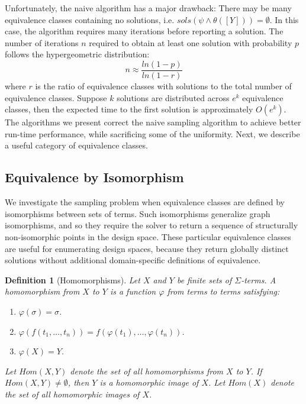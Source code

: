 \documentclass[conference]{IEEEtran}
\newtheorem{defn}{Definition}
\newcommand{\Hom}[2]{\mathit{Hom}(#1,#2)}
\newcommand{\HImg}[1]{\mathit{Hom}(#1)}
\newcommand{\sols}[1]{\mathit{sols}(#1)}
\begin{document}
Unfortunately, the naive algorithm has a major drawback: There may be many equivalence classes containing no solutions, i.e. $\sols{\psi \wedge \theta([Y])} = \emptyset$. In this case, the algorithm requires many iterations before reporting a solution. The number of iterations $n$ required to obtain at least one solution with probability $p$ follows the hypergeometric distribution:
\begin{equation}
n \approx \frac{ln(1-p)}{ln(1-r)}
\end{equation}
where $r$ is the ratio of equivalence classes with solutions to the total number of equivalence classes. Suppose $k$ solutions are distributed across $e^k$ equivalence classes, then the expected time to the first solution is approximately $O(e^k)$. The algorithms we present correct the naive sampling algorithm to achieve better run-time performance, while sacrificing some of the uniformity. Next, we describe a useful category of equivalence classes.

\subsection{Equivalence by Isomorphism}
We investigate the sampling problem when equivalence classes are defined by isomorphisms between sets of terms. Such isomorphisms generalize graph isomorphisms, and so they require the solver to return a sequence of structurally non-isomorphic points in the design space. These particular equivalence classes are useful for enumerating design spaces, because they return globally distinct solutions without additional domain-specific definitions of equivalence.  

\begin{defn}[Homomorphisms] Let $X$ and $Y$ be finite sets of $\Sigma$-terms. A \textit{homomorphism} from $X$ to $Y$ is a function $\varphi$ from terms to terms satisfying:
\begin{enumerate}
\item $\varphi(\sigma) = \sigma$.
\item $\varphi(f(t_1,\ldots,t_n)) = f(\varphi(t_1),\ldots,\varphi(t_n))$.
\item $\varphi(X) = Y$.
\end{enumerate}
Let $\Hom{X}{Y}$ denote the set of all homomorphisms from $X$ to $Y$. If $\Hom{X}{Y} \neq \emptyset$, then $Y$ is a homomorphic image of $X$. Let $\HImg{X}$ denote the set of all homomorphic images of $X$.
\end{defn}
\end{document}
